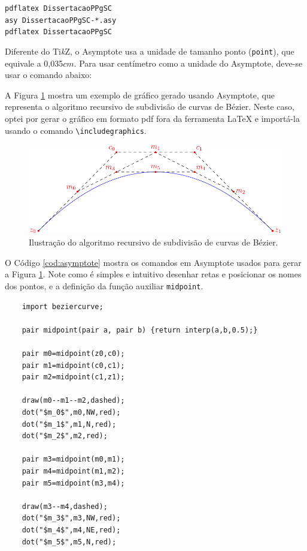 \begin{adjustbox}{fbox, center, tabular=l, vspace=0.5cm}
	\texttt{pdflatex DissertacaoPPgSC} \\
	\texttt{asy DissertacaoPPgSC-*.asy} \\
	\texttt{pdflatex DissertacaoPPgSC} 
\end{adjustbox}

Diferente do Ti\textit{k}Z, o Asymptote usa a unidade de tamanho ponto (\texttt{point}), que equivale a 0,035$cm$. Para usar centímetro como a unidade do Asymptote, deve-se usar o comando abaixo:


A Figura \ref{fig:beziersub} mostra um exemplo de gráfico gerado usando Asymptote, que representa o algoritmo recursivo de subdivisão de curvas de Bézier. Neste caso, optei por gerar o gráfico em formato \gls{pdf} fora da ferramenta \LaTeX{} e importá-la usando o comando \texttt{\textbackslash includegraphics}.

\begin{figure}[H]
	\centering
	\includegraphics[scale=1]{imagens/capitulo5/bezier2.pdf}
	\caption{Ilustração do algoritmo recursivo de subdivisão de curvas de Bézier.}
	\label{fig:beziersub}
\end{figure}

O Código \ref{cod:asymptote} mostra os comandos em Asymptote usados para gerar a Figura \ref{fig:beziersub}. Note como é simples e intuitivo desenhar retas e posicionar os nomes dos pontos, e a definição da função auxiliar \texttt{midpoint}. 

\begin{listing}[ht]
	\begin{verbatim}
	import beziercurve;

	pair midpoint(pair a, pair b) {return interp(a,b,0.5);}

	pair m0=midpoint(z0,c0);
	pair m1=midpoint(c0,c1);
	pair m2=midpoint(c1,z1);

	draw(m0--m1--m2,dashed);
	dot("$m_0$",m0,NW,red);
	dot("$m_1$",m1,N,red);
	dot("$m_2$",m2,red);

	pair m3=midpoint(m0,m1);
	pair m4=midpoint(m1,m2);
	pair m5=midpoint(m3,m4);

	draw(m3--m4,dashed);
	dot("$m_3$",m3,NW,red);
	dot("$m_4$",m4,NE,red);
	dot("$m_5$",m5,N,red);
	\end{verbatim}
	\caption{Código Asymptote usado para gerar a Figura \ref{fig:beziersub}.}
	\label{cod:asymptote}
\end{listing}



